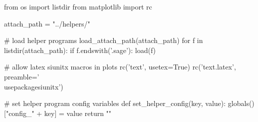 \begin{sagesilent}
    from os import listdir
    from matplotlib import rc

    attach_path = "../helpers/"

    # load helper programs
    load_attach_path(attach_path)
    for f in listdir(attach_path):
        if f.endswith('.sage'): load(f)

    # allow latex siunitx macros in plots
    rc('text', usetex=True)
    rc('text.latex', preamble='\\usepackage{siunitx}')

    # set helper program config variables
    def set_helper_config(key, value):
        globals()["config_" + key] = value
        return ""
\end{sagesilent}

\loadsciconfig